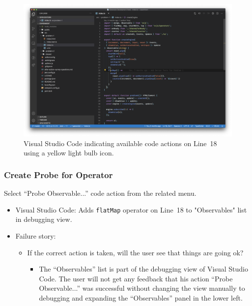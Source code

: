 \documentclass[sigplan,screen,nonacm,review]{acmart}
\begin{document}
\begin{figure}[ht]
	\centering
	\includegraphics[width=\columnwidth]{walkthrough-screenshots/step3and4.png}
	\Description{}
	\caption{Visual Studio Code indicating available code actions on Line~18 using a yellow light bulb icon.}
	\label{fig:walkthrough-screesnhot-step-3}
\end{figure}


\subsubsection{Create Probe for Operator}
Select ``Probe Observable...'' code action from the related menu.

\begin{itemize}
	\item Visual Studio Code: Adds \texttt{flatMap} operator on Line~18 to "Observables" list in debugging view.
	\item Failure story:
	      \begin{itemize}
	      	\item If the correct action is taken, will the user see that things are going ok?
	      	      \begin{itemize}
	      	      	\item The ``Observables'' list is part of the debugging view of Visual Studio Code. The user will not get any feedback that his action ``Probe Observable...'' was successful without changing the view manually to debugging and expanding the ``Observables'' panel in the lower left.
	      	      \end{itemize}
	      \end{itemize}
\end{itemize}
\end{document}
